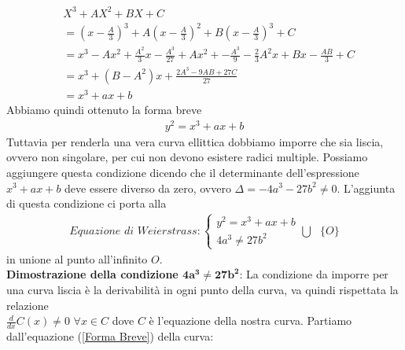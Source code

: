 \documentclass[a4paper,12pt]{tesiinfo}
\newcommand\ddfrac[2]{\frac{\displaystyle #1}{\displaystyle #2}}
\begin{document}
\begin{align*}
&X^3 + AX^2 + BX + C 
\\
&=\left(x- \ddfrac{A}{3} \right )^3 +A\left ( x - \ddfrac{A}{3} \right )^2 + B\left (x - \ddfrac{A}{3} \right )^3 +C
\\
&= x^3-Ax^2 + \ddfrac{A^2}{3}x - \ddfrac{A^3}{27} + Ax^2 + - \ddfrac{A^3}{9} -\ddfrac{2}{3}A^2x + Bx - \ddfrac{AB}{3} +C
\\
&= x^3 + (B-A^2)x + \ddfrac{2A^3-9AB+27C}{27}
\\
&= x^3 + ax+b
\end{align*}
Abbiamo quindi ottenuto la forma breve
\begin{gather}
y^2 = x^3 + ax+b
\label{Forma Breve}
\end{gather}
Tuttavia per renderla una vera curva ellittica dobbiamo imporre che sia liscia, ovvero non singolare, per cui non devono esistere radici multiple. Possiamo aggiungere questa condizione dicendo che il determinante dell'espressione $x^3 + ax+b$ deve essere diverso da zero, ovvero $\Delta = -4a^3 - 27b^2 \ne 0$. L'aggiunta di questa condizione ci porta alla
\begin{gather}
\textit{Equazione di Weierstrass}:
\begin{cases}
y^2 = x^3 + ax+b\\
4a^3 \ne 27b^2\end{cases}
\bigcup \text{ } \{O\}
\end{gather}
in unione al punto all'infinito $O$.
\\
\textbf{Dimostrazione della condizione $\mathbold{4a^3 \ne 27b^2}$}: La condizione da imporre per una curva liscia \`e la derivabilit\`a in ogni punto della curva, va quindi rispettata la relazione\\ $\ddfrac{d}{dx}C(x) \ne 0$ $ \forall x \in C$ dove $C$ \`e l'equazione della nostra curva. Partiamo dall'equazione (\ref{Forma Breve}) della curva: 
\end{document}
